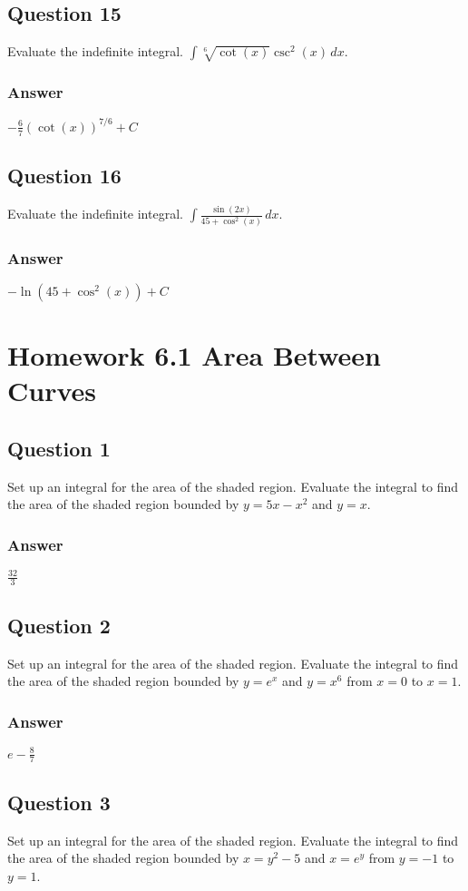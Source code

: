 \documentclass{article}
\begin{document}
\subsection*{Question 15}
Evaluate the indefinite integral. $\int \sqrt[6]{\cot(x)}\csc^2(x) \,dx$.
\subsubsection*{Answer}
$ -\frac{6}{7}(\cot(x))^{7/6} + C $

\subsection*{Question 16}
Evaluate the indefinite integral. $\int \frac{\sin(2x)}{45 + \cos^2(x)} \,dx$.
\subsubsection*{Answer}
$ -\ln(45 + \cos^2(x)) + C $

\newpage
\section{Homework 6.1 Area Between Curves}

\subsection*{Question 1}
Set up an integral for the area of the shaded region. Evaluate the integral to find the area of the shaded region bounded by $y=5x-x^2$ and $y=x$.
\subsubsection*{Answer}
$ \frac{32}{3} $

\subsection*{Question 2}
Set up an integral for the area of the shaded region. Evaluate the integral to find the area of the shaded region bounded by $y=e^x$ and $y=x^6$ from $x=0$ to $x=1$.
\subsubsection*{Answer}
$ e - \frac{8}{7} $

\subsection*{Question 3}
Set up an integral for the area of the shaded region. Evaluate the integral to find the area of the shaded region bounded by $x=y^2-5$ and $x=e^y$ from $y=-1$ to $y=1$.
\end{document}
